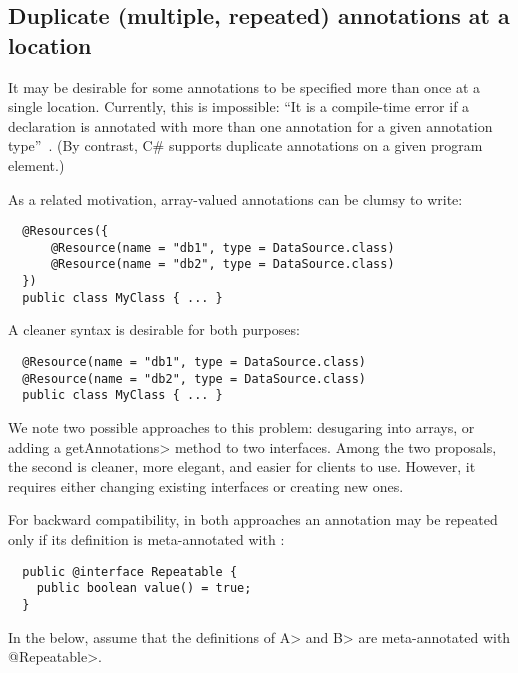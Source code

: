 \documentclass[10pt]{article}
\begin{document}
\subsection{Duplicate (multiple, repeated) annotations at a location\label{duplicate-annotations}}


It may be desirable for some
annotations to be
specified more than once at a single location.
Currently, this is impossible: ``It is a compile-time
error if a declaration is annotated with more than one annotation for a
given annotation type''~\cite[\S9.7]{GoslingJSB2005}.
(By contrast, C\# supports duplicate annotations on a given program element.)

As a related motivation, array-valued annotations can be clumsy to write:

\begin{Verbatim}
  @Resources({
      @Resource(name = "db1", type = DataSource.class)
      @Resource(name = "db2", type = DataSource.class)
  })
  public class MyClass { ... }
\end{Verbatim}

A cleaner syntax is desirable for both purposes:

\begin{Verbatim}
  @Resource(name = "db1", type = DataSource.class)
  @Resource(name = "db2", type = DataSource.class)
  public class MyClass { ... }
\end{Verbatim}

We note two possible approaches to this problem:  desugaring into arrays,
or adding a \<getAnnotations> method to two interfaces.
Among the two proposals, the second is cleaner, more elegant, and easier
for clients to use.  However, it requires either changing existing
interfaces or creating new ones.

For backward compatibility, in both approaches an annotation may be
repeated only if its definition is meta-annotated with :

\begin{Verbatim} 
  public @interface Repeatable {
    public boolean value() = true;
  }
\end{Verbatim}

\noindent
In the below, assume that the definitions of \<A> and \<B> are
meta-annotated with \<@Repeatable>.

\end{document}
